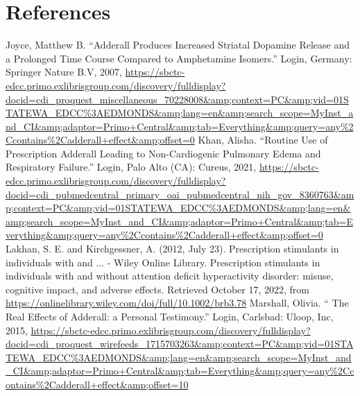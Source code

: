 \documentclass{article}
\begin{document}
    \section{References}
        \renewcommand{\section}[2]{}%
        \begin{thebibliography}{}
                Joyce, Matthew B. “Adderall Produces Increased Striatal Dopamine Release and a Prolonged Time Course Compared to Amphetamine Isomers.” Login, Germany: Springer Nature B.V, 2007, \url{https://sbctc-edcc.primo.exlibrisgroup.com/discovery/fulldisplay?docid=cdi_proquest_miscellaneous_70228008&amp;context=PC&amp;vid=01STATEWA_EDCC%3AEDMONDS&amp;lang=en&amp;search_scope=MyInst_and_CI&amp;adaptor=Primo+Central&amp;tab=Everything&amp;query=any%2Ccontains%2Cadderall+effect&amp;offset=0}
                Khan, Alisha. “Routine Use of Prescription Adderall Leading to Non-Cardiogenic Pulmonary Edema and Respiratory Failure.” Login, Palo Alto (CA): Cureus, 2021, \url{https://sbctc-edcc.primo.exlibrisgroup.com/discovery/fulldisplay?docid=cdi_pubmedcentral_primary_oai_pubmedcentral_nih_gov_8360763&amp;context=PC&amp;vid=01STATEWA_EDCC%3AEDMONDS&amp;lang=en&amp;search_scope=MyInst_and_CI&amp;adaptor=Primo+Central&amp;tab=Everything&amp;query=any%2Ccontains%2Cadderall+effect&amp;offset=0}
                Lakhan, S. E. and Kirchgessner, A. (2012, July 23). Prescription stimulants in individuals with and ... - Wiley Online Library. Prescription stimulants in individuals with and without attention deficit hyperactivity disorder: misuse, cognitive impact, and adverse effects. Retrieved October 17, 2022, from \url{https://onlinelibrary.wiley.com/doi/full/10.1002/brb3.78}
                Marshall, Olivia. “ The Real Effects of Adderall: a Personal Testimony.” Login, Carlsbad: Uloop, Inc, 2015, 
                \url{https://sbctc-edcc.primo.exlibrisgroup.com/discovery/fulldisplay?docid=cdi_proquest_wirefeeds_1715703263&amp;context=PC&amp;vid=01STATEWA_EDCC%3AEDMONDS&amp;lang=en&amp;search_scope=MyInst_and_CI&amp;adaptor=Primo+Central&amp;tab=Everything&amp;query=any%2Ccontains%2Cadderall+effect&amp;offset=10}

\end{thebibliography}
\end{document}
